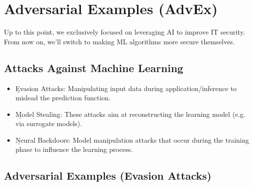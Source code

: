 \section{Adversarial Examples (AdvEx)}

Up to this point, we exclusively focused on leveraging AI to improve IT security. From now on, we'll switch to making ML algorithms more secure themselves.




\subsection{Attacks Against Machine Learning}

\begin{itemize}
\item \b{Evasion Attacks}: Manipulating input data during application/inference to mislead the prediction function.
\item \b{Model Stealing}: These attacks aim at reconstructing the learning model (e.g. via surrogate models).
\item \b{Neural Backdoors}: Model manipulation attacks that occur during the training phase to influence the learning process.
\end{itemize}





\subsection{Adversarial Examples (Evasion Attacks)}
